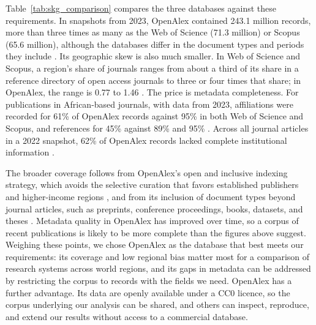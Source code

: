 \documentclass[10pt,twocolumn,a4paper]{article}
\begin{document}
	Table~\ref{tab:skg_comparison} compares the three databases against these requirements. In snapshots from 2023, OpenAlex contained 243.1 million records, more than three times as many as the Web of Science (71.3 million) or Scopus (65.6 million), although the databases differ in the document types and periods they include \parencite{culbert2025reference}. Its geographic skew is also much smaller. In Web of Science and Scopus, a region's share of journals ranges from about a third of its share in a reference directory of open access journals to three or four times that share; in OpenAlex, the range is 0.77 to 1.46 \parencite{Maddi2025GeographicalDisciplinaryCoverage}. The price is metadata completeness. For publications in African-based journals, with data from 2023, affiliations were recorded for 61\% of OpenAlex records against 95\% in both Web of Science and Scopus, and references for 45\% against 89\% and 95\% \parencite{alonsoalvarez2025coverage}. Across all journal articles in a 2022 snapshot, 62\% of OpenAlex records lacked complete institutional information \parencite{zhang2024missing}.
	
	The broader coverage follows from OpenAlex's open and inclusive indexing strategy, which avoids the selective curation that favors established publishers and higher-income regions \parencite{Maddi2025GeographicalDisciplinaryCoverage}, and from its inclusion of document types beyond journal articles, such as preprints, conference proceedings, books, datasets, and theses \parencite{openalex2023,zhang2024missing}. Metadata quality in OpenAlex has improved over time, so a corpus of recent publications is likely to be more complete than the figures above suggest. Weighing these points, we chose OpenAlex as the database that best meets our requirements: its coverage and low regional bias matter most for a comparison of research systems across world regions, and its gaps in metadata can be addressed by restricting the corpus to records with the fields we need. OpenAlex has a further advantage. Its data are openly available under a CC0 licence, so the corpus underlying our analysis can be shared, and others can inspect, reproduce, and extend our results without access to a commercial database.
	
\end{document}
